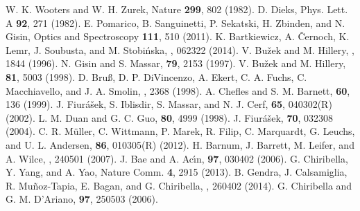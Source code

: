\documentclass[aps,prl,twocolumn,showpacs]{revtex4}
\begin{document}
\begin{thebibliography}{99}


 W. K. Wooters and W. H. Zurek, Nature {\bf 299}, 802 (1982).
 D. Dieks, Phys. Lett. A {\bf 92}, 271 (1982).
 E. Pomarico, B. Sanguinetti, P. Sekatski, H. Zbinden, and N. Gisin, Optics and Spectroscopy \textbf{111}, 510 (2011).
 K. Bartkiewicz, A. {\v C}ernoch, K. Lemr, J. Soubusta, and M. Stobi{\' n}ska, , 062322 (2014).
 V. Bu{\v z}ek and M. Hillery, , 1844 (1996).
N. Gisin and S. Massar, \prl \textbf{79}, 2153 (1997).
 V. Bu{\v z}ek and M. Hillery, \prl \textbf{81}, 5003 (1998).
 D. Bru{\ss}, D. P. DiVincenzo, A. Ekert, C. A. Fuchs, C. Macchiavello,
and J. A. Smolin, , 2368 (1998).
 A. Chefles and S. M. Barnett, \pra \textbf{60}, 136 (1999).
 J. Fiur{\' a}{\v s}ek, S. Iblisdir, S. Massar, and N. J. Cerf, \pra \textbf{65}, 040302(R) (2002).
 L. M. Duan and G. C. Guo, \prl \textbf{80}, 4999 (1998).
 J. Fiur{\' a}{\v s}ek, \pra \textbf{70}, 032308 (2004).
 C. R. M{\" u}ller, C. Wittmann, P. Marek, R. Filip, C. Marquardt, G. Leuchs, and U. L. Andersen, \pra \textbf{86}, 010305(R) (2012).
 H. Barnum, J. Barrett, M. Leifer, and A. Wilce, , 240501 (2007).
 J. Bae and A. Ac\'{\i}n, \prl \textbf{97}, 030402 (2006).
 G. Chiribella, Y. Yang, and A. Yao, Nature Comm. \textbf{4}, 2915 (2013).
  B. Gendra, J. Calsamiglia, R. Mu{\~ n}oz-Tapia, E. Bagan, and G. Chiribella, , 260402 (2014).
 G. Chiribella and G. M. D'Ariano, \prl \textbf{97}, 250503 (2006).


\end{thebibliography}
\end{document}
